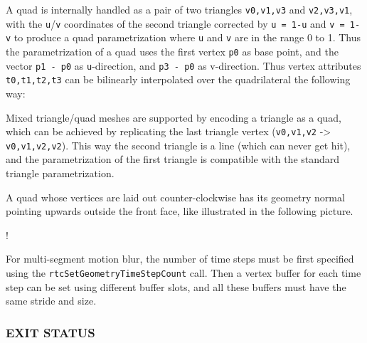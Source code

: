 A quad is internally handled as a pair of two triangles
\texttt{v0,v1,v3} and \texttt{v2,v3,v1}, with the
\texttt{u\textquotesingle{}}/\texttt{v\textquotesingle{}} coordinates of
the second triangle corrected by \texttt{u\ =\ 1-u\textquotesingle{}}
and \texttt{v\ =\ 1-v\textquotesingle{}} to produce a quad
parametrization where \texttt{u} and \texttt{v} are in the range 0 to 1.
Thus the parametrization of a quad uses the first vertex \texttt{p0} as
base point, and the vector \texttt{p1\ -\ p0} as \texttt{u}-direction,
and \texttt{p3\ -\ p0} as v-direction. Thus vertex attributes
\texttt{t0,t1,t2,t3} can be bilinearly interpolated over the
quadrilateral the following way:

\begin{Shaded}
\begin{Highlighting}[]
\OperatorTok{=} \OperatorTok{(}\OperatorTok{{-}}\OperatorTok{)((}\OperatorTok{{-}}\OperatorTok{)*}\OperatorTok{+}\OperatorTok{*}\OperatorTok{)} \OperatorTok{+}\OperatorTok{*((}\OperatorTok{{-}}\OperatorTok{)*}\OperatorTok{+}\OperatorTok{*}\OperatorTok{)}
\end{Highlighting}
\end{Shaded}

Mixed triangle/quad meshes are supported by encoding a triangle as a
quad, which can be achieved by replicating the last triangle vertex
(\texttt{v0,v1,v2} -\textgreater{} \texttt{v0,v1,v2,v2}). This way the
second triangle is a line (which can never get hit), and the
parametrization of the first triangle is compatible with the standard
triangle parametrization.

A quad whose vertices are laid out counter-clockwise has its geometry
normal pointing upwards outside the front face, like illustrated in the
following picture.

!\href{images/quad_uv.pdf}{}

For multi-segment motion blur, the number of time steps must be first
specified using the \texttt{rtcSetGeometryTimeStepCount} call. Then a
vertex buffer for each time step can be set using different buffer
slots, and all these buffers must have the same stride and size.

\subsubsection{EXIT STATUS}\label{exit-status}

